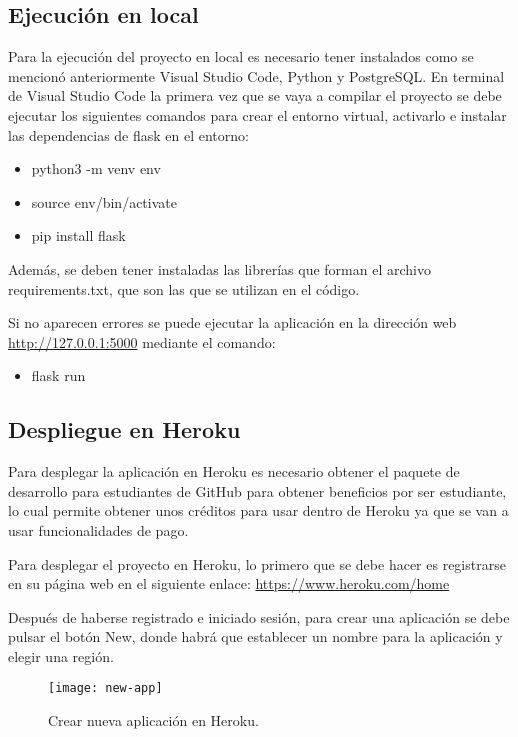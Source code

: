 \subsection{Ejecución en local}
Para la ejecución del proyecto en local es necesario tener instalados como se mencionó anteriormente Visual Studio Code, Python y PostgreSQL. En terminal de Visual Studio Code la primera vez que se vaya a compilar el proyecto se debe ejecutar los siguientes comandos para crear el entorno virtual, activarlo e instalar las dependencias de flask en el entorno:
\begin{itemize}
    \item python3 -m venv env
    \item source env/bin/activate
    \item pip install flask
\end{itemize}

Además, se deben tener instaladas las librerías que forman el archivo
requirements.txt, que son las que se utilizan en el código.

Si no aparecen errores se puede ejecutar la aplicación en la dirección web \url{http://127.0.0.1:5000} mediante el comando:
\begin{itemize}
    \item flask run
\end{itemize}

\subsection{Despliegue en Heroku}
Para desplegar la aplicación en Heroku es necesario obtener el paquete de desarrollo para estudiantes de GitHub para obtener beneficios por ser estudiante, lo cual permite obtener unos créditos para usar dentro de Heroku ya que se van a usar funcionalidades de pago.

Para desplegar el proyecto en Heroku, lo primero que se debe hacer es
registrarse en su página web en el siguiente enlace: \url{https://www.heroku.com/home}

Después de haberse registrado e iniciado sesión, para crear una aplicación se debe pulsar el botón New, donde habrá que establecer un nombre para la aplicación y elegir una región.
    \begin{figure}[htbp]
    \centering
    \texttt{[image: new-app]}
    \caption{Crear nueva aplicación en Heroku.}
    \label{fig:new-app}
    \end{figure}

